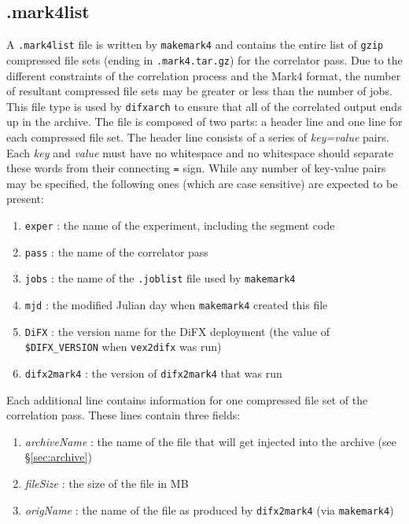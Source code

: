 
\subsection{.mark4list} \label{sec:mark4list}

A {\tt .mark4list} file is written by {\tt makemark4} and contains the entire list of {\tt gzip} compressed file sets (ending in {\tt .mark4.tar.gz}) for the correlator pass.
Due to the different constraints of the correlation process and the Mark4 format, the number of resultant compressed file sets may be greater or less than the number of jobs.
This file type is used by {\tt difxarch} to ensure that all of the correlated output ends up in the archive.
The file is composed of two parts: a header line and one line for each compressed file set.
The header line consists of a series of {\em key=value} pairs.  
Each {\em key} and {\em value} must have no whitespace and no whitespace should separate these words from their connecting {\tt =} sign.
While any number of key-value pairs may be specified, the following ones (which are case sensitive) are expected to be present:
\begin{enumerate}
\item {\tt exper} : the name of the experiment, including the segment code
\item {\tt pass} : the name of the correlator pass
\item {\tt jobs} : the name of the {\tt .joblist} file used by {\tt makemark4}
\item {\tt mjd} : the modified Julian day when {\tt makemark4} created this file
\item {\tt DiFX} : the version name for the DiFX deployment (the value of {\tt \$DIFX\_VERSION} when {\tt vex2difx} was run)
\item {\tt difx2mark4} : the version of {\tt difx2mark4} that was run
\end{enumerate}
Each additional line contains information for one compressed file set of the correlation pass.
These lines contain three fields:
\begin{enumerate}
\item {\em archiveName} : the name of the file that will get injected into the archive (see \S\ref{sec:archive})
\item {\em fileSize} : the size of the file in MB
\item {\em origName} : the name of the file as produced by {\tt difx2mark4} (via {\tt makemark4})
\end{enumerate}





